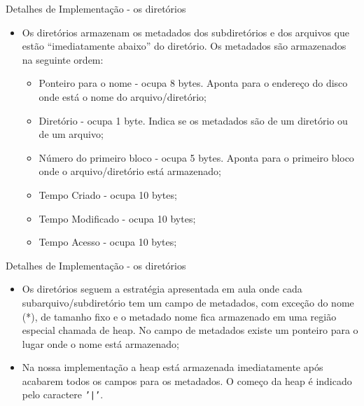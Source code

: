 \documentclass[10pt]{beamer}
\begin{document}
    \begin{frame}{Detalhes de Implementação - os diretórios}
        \begin{itemize}
            \justifying
            \item Os diretórios armazenam os metadados dos subdiretórios e dos arquivos que estão ``imediatamente abaixo'' do diretório. Os metadados são armazenados na seguinte ordem:
            \begin{itemize}
                \justifying
                \item Ponteiro para o nome - ocupa 8 bytes. Aponta para o endereço do disco onde está o nome do arquivo/diretório;
                \item Diretório - ocupa 1 byte. Indica se os metadados são de um diretório ou de um arquivo;
                \item Número do primeiro bloco - ocupa 5 bytes. Aponta para o primeiro bloco onde o arquivo/diretório está armazenado; 
                \item Tempo Criado - ocupa 10 bytes;
                \item Tempo Modificado - ocupa 10 bytes;
                \item Tempo Acesso - ocupa 10 bytes;                
            \end{itemize}
        \end{itemize}        
    \end{frame}
    \begin{frame}{Detalhes de Implementação - os diretórios}
        \begin{itemize}
            \justifying
            \begin{itemize}
                \justifying
                \item Tamanho - ocupa 8 bytes. Se os metadados são de um diretório, então esse valor é sempre 0;
                \item Nome* - ocupa x bytes. Ao fim do nome estará o caractere \texttt{'|'}.
            \end{itemize}
            \item Os diretórios seguem a estratégia apresentada em aula onde cada subarquivo/subdiretório tem um campo de metadados, com exceção do nome (*), de tamanho fixo e o metadado nome fica armazenado em uma região especial chamada de heap. No campo de metadados existe um ponteiro para o lugar onde o nome está armazenado;
            \item Na nossa implementação a heap está armazenada imediatamente após acabarem todos os campos para os metadados. O começo da heap é indicado pelo caractere \texttt{'|'}.
        \end{itemize}
    \end{frame}
\end{document}

